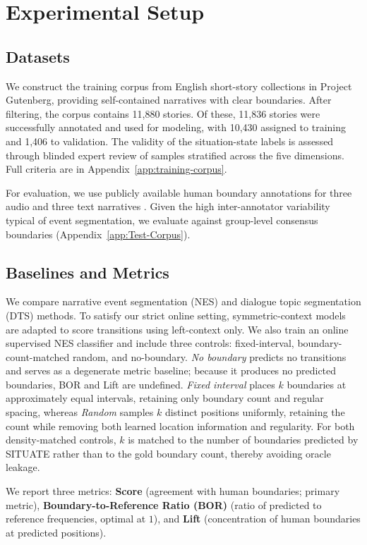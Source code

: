 \documentclass[11pt]{article}
\begin{document}
\section{Experimental Setup}
\label{sec:experiments}
\subsection{Datasets}
We construct the training corpus from English short-story collections in Project Gutenberg, providing self-contained narratives with clear boundaries. After filtering, the corpus contains 11,880 stories. Of these, 11,836 stories were successfully annotated and used for modeling, with 10,430 assigned to training and 1,406 to validation. The validity of the situation-state labels is assessed through blinded expert review of samples stratified across the five dimensions. Full criteria are in Appendix~\ref{app:training-corpus}.

For evaluation, we use publicly available human boundary annotations for three audio and three text narratives \citep{michelmann2025large,panela2025event}. Given the high inter-annotator variability typical of event segmentation, we evaluate against group-level consensus boundaries (Appendix~\ref{app:Test-Corpus}).

\subsection{Baselines and Metrics}
We compare narrative event segmentation (NES) and dialogue topic segmentation (DTS) methods. To satisfy our strict online setting, symmetric-context models are adapted to score transitions using left-context only. We also train an online supervised NES classifier and include three controls: fixed-interval, boundary-count-matched random, and no-boundary. \textit{No boundary} predicts no transitions and serves as a degenerate metric baseline; because it produces no predicted boundaries, BOR and Lift are undefined. \textit{Fixed interval} places $k$ boundaries at approximately equal intervals, retaining only boundary count and regular spacing, whereas \textit{Random} samples $k$ distinct positions uniformly, retaining the count while removing both learned location information and regularity. For both density-matched controls, $k$ is matched to the number of boundaries predicted by SITUATE rather than to the gold boundary count, thereby avoiding oracle leakage.

We report three metrics: \textbf{Score} (agreement with human boundaries; primary metric), \textbf{Boundary-to-Reference Ratio (BOR)} (ratio of predicted to reference frequencies, optimal at $1$), and \textbf{Lift} (concentration of human boundaries at predicted positions).
\end{document}

